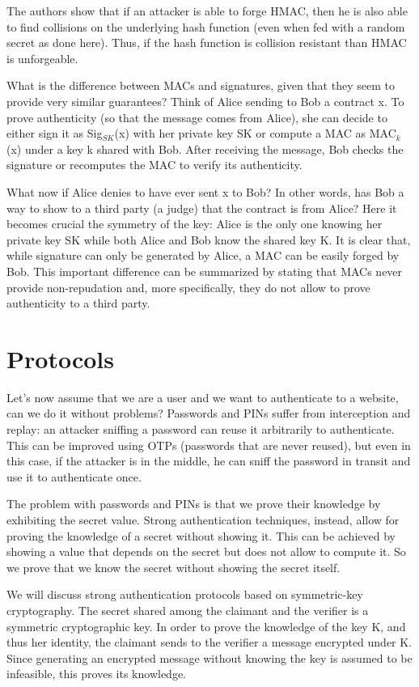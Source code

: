 \documentclass[a4paper, 12pt]{report}
\begin{document}
The authors show that if an attacker is able to forge HMAC, then he is also able to find collisions on the underlying hash function (even when fed with a random secret as done here). Thus, if the hash function is collision resistant than HMAC is unforgeable.

What is the difference between MACs and signatures, given that they seem to provide very similar guarantees? Think of Alice sending to Bob a contract x. To prove authenticity (so that the message comes from Alice), she can decide to either sign it as Sig$_{SK}$(x) with her private key SK or compute a MAC as MAC$_k$(x) under a key k shared with Bob. After receiving the message, Bob checks the signature or recomputes the MAC to verify its authenticity.

What now if Alice denies to have ever sent x to Bob? In other words, has Bob a way to show to a third party (a judge) that the contract is from Alice? Here it becomes crucial the symmetry of the key: Alice is the only one knowing her private key SK while both Alice and Bob know the shared key K. It is clear that, while signature can only be generated by Alice, a MAC can be easily forged by Bob. This important difference can be summarized by stating that MACs never provide non-repudation and, more specifically, they do not allow to prove authenticity to a third party.

\section*{Protocols}
Let's now assume that we are a user and we want to authenticate to a website, can we do it without problems? Passwords and PINs suffer from interception and replay: an attacker sniffing a password can reuse it arbitrarily to authenticate. This can be improved using OTPs (passwords that are never reused), but even in this case, if the attacker is in the middle, he can sniff the password in transit and use it to authenticate once.

The problem with passwords and PINs is that we prove their knowledge by exhibiting the secret value. Strong authentication techniques, instead, allow for proving the knowledge of a secret without showing it. This can be achieved by showing a value that depends on the secret but does not allow to compute it. So we prove that we know the secret without showing the secret itself.

We will discuss strong authentication protocols based on symmetric-key cryptography. The secret shared among the claimant and the verifier is a symmetric cryptographic key. In order to prove the knowledge of the key K, and thus her identity, the claimant sends to the verifier a message encrypted under K. Since generating an encrypted message without knowing the key is assumed to be infeasible, this proves its knowledge.
\end{document}
